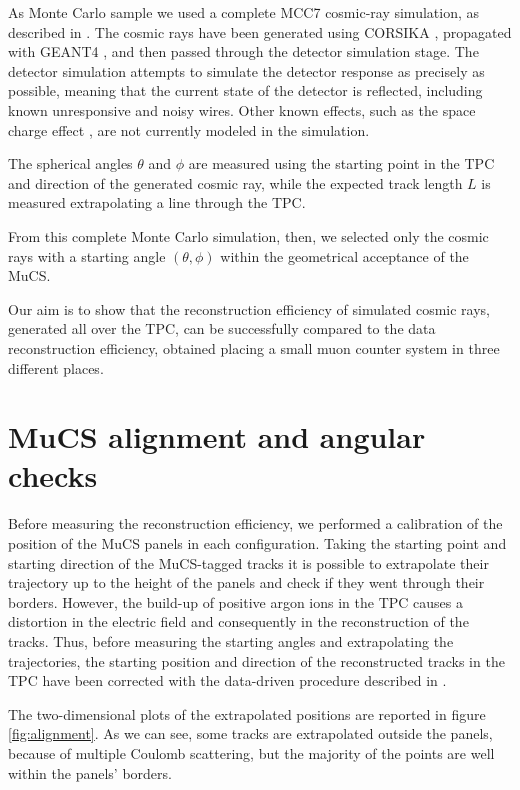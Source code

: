 \documentclass[a4paper]{scrartcl}
\begin{document}
As Monte Carlo sample we used a complete MCC7 cosmic-ray simulation, as described in \cite{cosmic}. The cosmic rays have been generated using CORSIKA \cite{corsika},  propagated with GEANT4 \cite{geant}, and then passed through the detector simulation stage. The detector simulation attempts to simulate the detector response as precisely as possible, meaning that the current state of the detector is reflected, including known unresponsive and noisy wires. Other known effects, such as the space charge effect \cite{sce}, are not currently modeled in the simulation.

The spherical angles $\theta$ and $\phi$ are measured using the starting point in the TPC and direction of the generated cosmic ray, while the expected track length $L$ is measured extrapolating a line through the TPC.

From this complete Monte Carlo simulation, then, we selected only the cosmic rays with a starting angle $(\theta,\phi)$ within the geometrical acceptance of the MuCS.

Our aim is to show that the reconstruction efficiency of simulated cosmic rays, generated all over the TPC, can be successfully compared to the data reconstruction efficiency, obtained placing a small muon counter system in three different places.

\section{MuCS alignment and angular checks}\label{sec:flux}
Before measuring the reconstruction efficiency, we performed a calibration of the position of the MuCS panels in each configuration. Taking the starting point and starting direction of the MuCS-tagged tracks it is possible to extrapolate their trajectory up to the height of the panels and check if they went through their borders. However, the build-up of positive argon ions in the TPC causes a distortion in the electric field and consequently in the reconstruction of the tracks. Thus, before measuring the starting angles and extrapolating the trajectories, the starting position and direction of the reconstructed tracks in the TPC have been corrected with the data-driven procedure described in \cite{sce}.

The two-dimensional plots of the extrapolated positions are reported in figure \ref{fig:alignment}. As we can see, some tracks are extrapolated outside the panels, because of multiple Coulomb scattering, but the majority of the points are well within the panels' borders.
\end{document}

